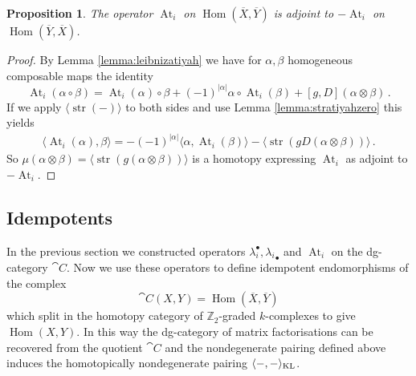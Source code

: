 \documentclass{compositio}
\newtheorem{proposition}[theorem]{Proposition}
\theoremstyle{definition}
\numberwithin{equation}{section}
\def\Hom{\operatorname{Hom}}
\DeclareMathOperator{\str}{str}
\DeclareMathOperator{\At}{At}
\begin{document}
\begin{proposition} The operator $\At_i$ on $\Hom(\overline{X}, \overline{Y})$ is adjoint to $-\At_i$ on $\Hom(\overline{Y}, \overline{X})$.
\end{proposition}
\begin{proof}
By Lemma \ref{lemma:leibnizatiyah} we have for $\alpha, \beta$ homogeneous composable maps the identity
\[
\At_i( \alpha \circ \beta ) = \At_i(\alpha) \circ \beta + (-1)^{|\alpha|} \alpha \circ \At_i(\beta) + [g,D]( \alpha \otimes \beta)\,.
\]
If we apply $\langle \str( - ) \rangle$ to both sides and use Lemma \ref{lemma:stratiyahzero} this yields
\begin{align*}
\langle \At_i(\alpha), \beta \rangle = -(-1)^{|\alpha|} \langle \alpha,  \At_i(\beta) \rangle - \langle \str( gD(\alpha \otimes \beta) ) \rangle\,.
\end{align*}
So $\mu( \alpha \otimes \beta ) = \langle \str( g( \alpha \otimes \beta ) ) \rangle$ is a homotopy expressing $\At_i$ as adjoint to $-\At_i$.
\end{proof}

\subsection{Idempotents}

In the previous section we constructed operators $\lambda_i^\bullet, {\lambda_i}_\bullet$ and $\At_i$ on the dg-category $\cat{C}$. Now we use these operators to define idempotent endomorphisms of the complex
\[
\cat{C}(X,Y) = \Hom(\overline{X}, \overline{Y})
\]
which split in the homotopy category of $\mathbb{Z}_2$-graded $k$-complexes to give $\Hom(X,Y)$. In this way the dg-category of matrix factorisations can be recovered from the quotient $\cat{C}$ and the nondegenerate pairing defined above induces the homotopically nondegenerate pairing $\langle -, - \rangle_{\textup{KL}}$.
\end{document}
